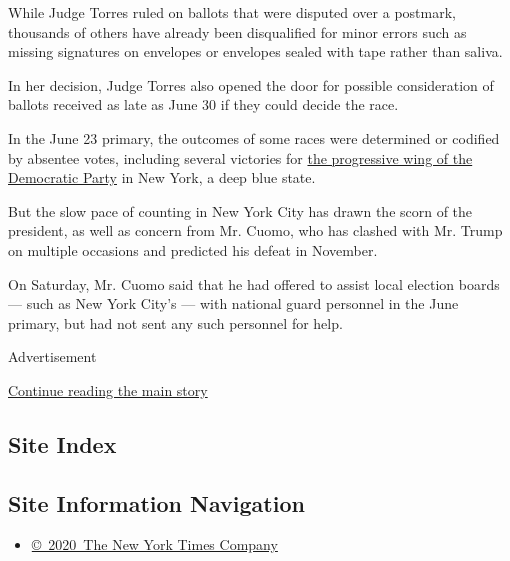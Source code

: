 While Judge Torres ruled on ballots that were disputed over a postmark,
thousands of others have already been disqualified for minor errors such
as missing signatures on envelopes or envelopes sealed with tape rather
than saliva.

In her decision, Judge Torres also opened the door for possible
consideration of ballots received as late as June 30 if they could
decide the race.

In the June 23 primary, the outcomes of some races were determined or
codified by absentee votes, including several victories for
\href{https://www.nytimes.com/2020/07/24/nyregion/progressive-primaries-ny-legislature.html?searchResultPosition=1}{the
progressive wing of the Democratic Party} in New York, a deep blue
state.

But the slow pace of counting in New York City has drawn the scorn of
the president, as well as concern from Mr. Cuomo, who has clashed with
Mr. Trump on multiple occasions and predicted his defeat in November.

On Saturday, Mr. Cuomo said that he had offered to assist local election
boards --- such as New York City's --- with national guard personnel in
the June primary, but had not sent any such personnel for help.

Advertisement

\protect\hyperlink{after-bottom}{Continue reading the main story}

\hypertarget{site-index}{%
\subsection{Site Index}\label{site-index}}

\hypertarget{site-information-navigation}{%
\subsection{Site Information
Navigation}\label{site-information-navigation}}

\begin{itemize}
\tightlist
\item
  \href{https://help.nytimes.com/hc/en-us/articles/115014792127-Copyright-notice}{©~2020~The
  New York Times Company}
\end{itemize}


